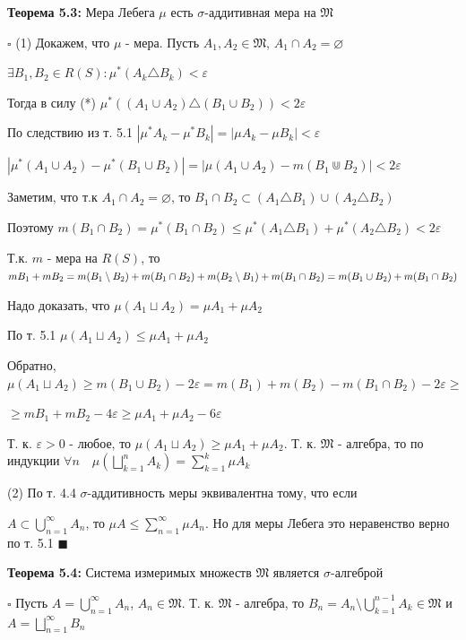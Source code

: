 \documentclass[a4paper]{report}
\newcommand*{\hm}[1]{#1\nobreak\discretionary{}%
            {\hbox{$\mathsurround=0pt #1$}}{}}
\begin{document}
\noindent\textbf{Теорема 5.3:} Мера Лебега $\mu$ есть $\sigma$-аддитивная мера на $\mathfrak M$

\noindent $\square$ (1) Докажем, что $\mu$ - мера. Пусть $A_1,A_2\in\mathfrak M$, $A_1\cap A_2=\varnothing$

$\exists B_1,B_2\in R(S)\colon\mu^*(A_k\triangle B_k)<\varepsilon$

Тогда в силу (*) $\mu^*\left((A_1\cup A_2)\triangle (B_1\cup B_2)\right)<2\varepsilon$

По следствию из т. 5.1 $|\mu^*A_k-\mu^*B_k|=|\mu A_k-\mu B_k|<\varepsilon$

$|\mu^*(A_1\cup A_2)-\mu^*(B_1\cup B_2)|=|\mu(A_1\cup A_2)-m(B_1\Cup B_2)|<2\varepsilon$

Заметим, что т.к $A_1\cap A_2=\varnothing$, то $B_1\cap B_2\subset(A_1\triangle B_1)\cup(A_2\triangle B_2)$

Поэтому $m(B_1\cap B_2)=\mu^*(B_1\cap B_2)\le\mu^*(A_1\triangle B_1)+\mu^*(A_2\triangle B_2)<2\varepsilon$

Т.к. $m$ - мера на $R(S)$, то $mB_1+mB_2=m(B_1\setminus B_2)+m(B_1\cap B_2)+m(B_2\hm\setminus B_1)+m(B_1\cap B_2)=
m(B_1\cup B_2)+m(B_1\cap B_2)$

Надо доказать, что $\mu(A_1\sqcup A_2)=\mu A_1+\mu A_2$

По т. 5.1 $\mu(A_1\sqcup A_2)\le\mu A_1+\mu A_2$

Обратно, $\mu(A_1\sqcup A_2)\ge m(B_1\cup B_2)-2\varepsilon=m(B_1)+m(B_2)-m(B_1\cap B_2)-2\varepsilon\ge$

\noindent$\ge mB_1+mB_2-4\varepsilon\ge\mu A_1+\mu A_2-6\varepsilon$

Т. к. $\varepsilon>0$ - любое, то $\mu(A_1\sqcup A_2)\ge \mu A_1+\mu A_2$. Т. к. $\mathfrak M$ - алгебра, то по индукции
$\forall n\quad\mu(\bigsqcup\limits_{k=1}^n A_k)=\sum\limits_{k=1}^k\mu A_k$

(2) По т. 4.4 $\sigma$-аддитивность меры эквивалентна тому, что если

$A\subset\bigcup\limits_{n=1}^\infty A_n$, то
$\mu A\le\sum\limits_{n=1}^\infty \mu A_n$. Но для меры Лебега это неравенство верно по т. 5.1 $\blacksquare$
\bigskip

\noindent\textbf{Теорема 5.4:} Система измеримых множеств $\mathfrak M$ является $\sigma$-алгеброй

\noindent $\square$ Пусть $A=\bigcup\limits_{n=1}^\infty A_n$, $A_n\in\mathfrak M$. Т. к. $\mathfrak M$ - алгебра, то
$B_n=A_n\setminus\bigcup\limits_{k=1}^{n-1} A_k\in\mathfrak M$ и $A=\bigsqcup\limits_{n=1}^\infty B_n$
\end{document}
